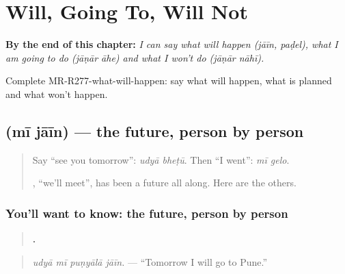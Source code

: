 
\chapter{Will, Going To, Will Not}
\label{ch:mr-will-going-to-will-not}

\begin{chapteropening}
\textbf{By the end of this chapter:} \emph{I can say what will happen (jāīn, paḍel), what I am going to do (jāṇār āhe) and what I won't do (jāṇār nāhī).}

Complete MR-R277-what-will-happen: say what will happen, what is planned and what won't happen.
\end{chapteropening}

\section[\texorpdfstring{\mr{मी} \mr{जाईन} (mī jāīn)}{मी जाईन (mī jāīn)}]{  (mī jāīn) — the future, person by person}

\label{lesson:MR-C277-jain}



\begin{quote}
Say \textquotedblleft{}see you tomorrow\textquotedblright{}: \emph{udyā bheṭū}. Then \textquotedblleft{}I went\textquotedblright{}: \emph{mī gelo}.

\textbf{}, \textquotedblleft{}we'll meet\textquotedblright{}, has been a future all along. Here are the others.
\end{quote}

\subsection*{You'll want to know: the future, person by person}
\begin{quote}
\textbf{   .}
\end{quote}

\begin{quote}
\emph{udyā mī puṇyālā jāīn.} — \textquotedblleft{}Tomorrow I will go to Pune.\textquotedblright{}
\end{quote}

